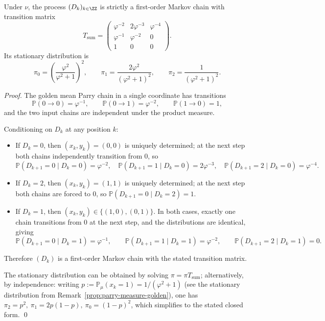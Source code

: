 \begin{proposition}\label{prop:real-input-digitwise-sum-parry-markov}
Under $\nu$, the process $(D_k)_{k\in\ZZ}$ is strictly a first-order Markov chain with transition matrix
\[
T_{\mathrm{sum}}=
\begin{pmatrix}
\varphi^{-2} & 2\varphi^{-3} & \varphi^{-4}\\
\varphi^{-1} & \varphi^{-2} & 0\\
1 & 0 & 0
\end{pmatrix}.
\]
Its stationary distribution is
\[
\pi_0=\left(\frac{\varphi^2}{\varphi^2+1}\right)^{\!2},\qquad
\pi_1=\frac{2\varphi^2}{(\varphi^2+1)^2},\qquad
\pi_2=\frac{1}{(\varphi^2+1)^2}.
\]
\end{proposition}

\begin{proof}
The golden mean Parry chain in a single coordinate has transitions
\[
\mathbb{P}(0\to 0)=\varphi^{-1},\qquad
\mathbb{P}(0\to 1)=\varphi^{-2},\qquad
\mathbb{P}(1\to 0)=1,
\]
and the two input chains are independent under the product measure.

Conditioning on $D_k$ at any position $k$:
\begin{itemize}
  \item If $D_k=0$, then $(x_k,y_k)=(0,0)$ is uniquely determined; at the next step both chains independently transition from $0$, so
  \[
  \mathbb{P}(D_{k+1}=0\mid D_k=0)=\varphi^{-2},\quad
  \mathbb{P}(D_{k+1}=1\mid D_k=0)=2\varphi^{-3},\quad
  \mathbb{P}(D_{k+1}=2\mid D_k=0)=\varphi^{-4}.
  \]
  \item If $D_k=2$, then $(x_k,y_k)=(1,1)$ is uniquely determined; at the next step both chains are forced to $0$, so $\mathbb{P}(D_{k+1}=0\mid D_k=2)=1$.
  \item If $D_k=1$, then $(x_k,y_k)\in\{(1,0),(0,1)\}$. In both cases, exactly one chain transitions from $0$ at the next step, and the distributions are identical, giving
  \[
  \mathbb{P}(D_{k+1}=0\mid D_k=1)=\varphi^{-1},\qquad
  \mathbb{P}(D_{k+1}=1\mid D_k=1)=\varphi^{-2},\qquad
  \mathbb{P}(D_{k+1}=2\mid D_k=1)=0.
  \]
\end{itemize}
Therefore $(D_k)$ is a first-order Markov chain with the stated transition matrix.

The stationary distribution can be obtained by solving $\pi=\pi T_{\mathrm{sum}}$; alternatively, by independence:
writing $p:=\mathbb{P}_\mu(x_k=1)=1/(\varphi^2+1)$ (see the stationary distribution from Remark~\ref{prop:parry-measure-golden}), one has
\(
\pi_2=p^2,\ \pi_1=2p(1-p),\ \pi_0=(1-p)^2
\), which simplifies to the stated closed form. \qed
\end{proof}


